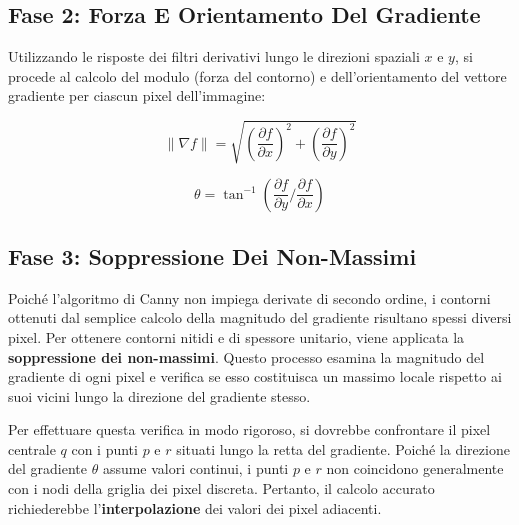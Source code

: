 ﻿\documentclass[11pt, a4paper]{article}
\begin{document}
\subsection{Fase 2: Forza E Orientamento Del Gradiente}

Utilizzando le risposte dei filtri derivativi lungo le direzioni spaziali $x$ e $y$, si procede al calcolo del modulo (forza del contorno) e dell'orientamento del vettore gradiente per ciascun pixel dell'immagine:

\[ \|\nabla f\| = \sqrt{\left(\frac{\partial f}{\partial x}\right)^2 + \left(\frac{\partial f}{\partial y}\right)^2} \]

\[ \theta = \tan^{-1}\left( \frac{\partial f}{\partial y} \Big/ \frac{\partial f}{\partial x} \right) \]



\subsection{Fase 3: Soppressione Dei Non-Massimi}

Poiché l'algoritmo di Canny non impiega derivate di secondo ordine, i contorni ottenuti dal semplice calcolo della magnitudo del gradiente risultano spessi diversi pixel. Per ottenere contorni nitidi e di spessore unitario, viene applicata la \textbf{soppressione dei non-massimi}. Questo processo esamina la magnitudo del gradiente di ogni pixel e verifica se esso costituisca un massimo locale rispetto ai suoi vicini lungo la direzione del gradiente stesso.

Per effettuare questa verifica in modo rigoroso, si dovrebbe confrontare il pixel centrale $q$ con i punti $p$ e $r$ situati lungo la retta del gradiente. Poiché la direzione del gradiente $\theta$ assume valori continui, i punti $p$ e $r$ non coincidono generalmente con i nodi della griglia dei pixel discreta. Pertanto, il calcolo accurato richiederebbe l'\textbf{interpolazione} dei valori dei pixel adiacenti.

\end{document}
